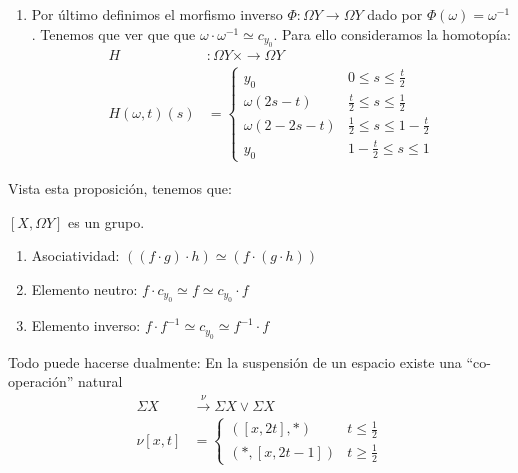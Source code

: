 \begin{demo}
\begin{enumerate}
\item Por último definimos el morfismo inverso $\varPhi : \Omega Y \longrightarrow \Omega Y $ dado por $\varPhi(\omega) = \omega^{-1}$. Tenemos que ver que que $\omega \cdotp \omega^{-1} \simeq c_{y_0}$. Para ello consideramos la homotopía:
\begin{align*}
H &: \Omega Y \times \longrightarrow \Omega Y \\
H(\omega, t)(s) &= 
\begin{cases}
y_0 & 0 \leq s \leq \frac{t}{2} \\
\omega(2s - t) & \frac{t}{2} \leq s \leq \frac{1}{2} \\
\omega(2 - 2s - t) & \frac{1}{2} \leq s \leq 1 - \frac{t}{2} \\
y_0 & 1 - \frac{t}{2} \leq s \leq 1
\end{cases}
\end{align*}
\end{enumerate}
\end{demo}
Vista esta proposición, tenemos que:
\begin{teor}
$[X, \Omega Y]$ es un grupo.
\end{teor}
\begin{demo}
\begin{enumerate}
\item Asociatividad: $ \left((f \cdotp g) \cdotp h \right) \simeq \left(f \cdotp (g \cdotp h) \right)  $
\item Elemento neutro: $f \cdotp c_{y_0} \simeq f \simeq c_{y_0} \cdotp f$
\item Elemento inverso: $ f \cdotp f^{-1} \simeq c_{y_0} \simeq f^{-1} \cdotp f$
\end{enumerate}
\end{demo}
Todo puede hacerse dualmente: En la suspensión de un espacio existe una ``co-operación'' natural
\begin{align*}
\Sigma X &\stackrel{\nu}{\longrightarrow} \Sigma X \vee \Sigma X \\
\nu [x, t] &= 
\begin{cases}
([x, 2t], \ast ) & t \leq \frac{1}{2} \\
( \ast, [x, 2t -1]) & t \geq \frac{1}{2}
\end{cases}
\end{align*}

